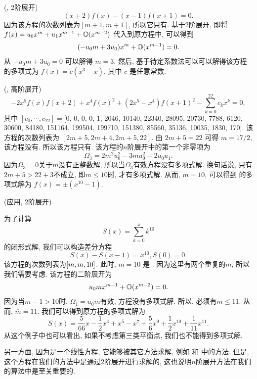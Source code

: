 \begin{example}
(\BPthree{}, 2阶展开)
\begin{equation}
(x+2)f(x)-(x-1)f(x+1)=0. \label{ep3}
\end{equation}
因为该方程的次数列表为$[m+1,m+1]$, 所以它只有\BPthree{}. 基于2阶展开, 即将$f(x)=u_0 x^m + u_1 x^{m-1} + \mathbb O(x^{m-2})$ 代入到原方程中, 可以得到
\begin{equation}
(-u_0 m+3u_0)x^m+\mathbb O(x^{m-1})=0.
\end{equation}
从 $-u_0 m+3u_0=0$ 可以解得 $m=3$. 然后, 基于待定系数法可以可以解得该方程的多项式为 $f(x)=c(x^3-x)$, 其中 $c$ 是任意常数.
\end{example}

\begin{example}
(\BPthree{}, 高阶展开)
\begin{equation}
-2x^5f(x)f(x+2)+x^4f(x)^2+(2x^5-x^4)f(x+1)^2-\sum_{k=0}^{22}{c_k x^k}=0, \label{ep4}
\end{equation}
其中 $[c_0,\cdots,c_{22}]=$[0, 0, 0, 0, 1, 2046, 10140, 22340, 28095, 20730, 7788, 6120, 30600, 84180, 151164, 199504, 199710, 151380, 85560, 35136, 10035, 1830, 170]. 该方程的次数列表为 $[2m+5,2m+4,2m+5,22]$. 由 $2m+5=22$ 可得 $ m=17/2$, 该方程没有\BPone{}. 所以该方程只有\BPthree{}. 该方程的$n$阶展开中的第一个非零项为 
\begin{equation}
\Omega_3 = 2m^2u_0^2-3mu_0^2-2u_0u_1.
\end{equation}
因为$\Omega_3=0$关于$m$没有正整数解, 所以当$\Omega_3$有效方程没有多项式解. 换句话说, 只有$2m+5>22+3$不成立, 即$m\le 10$时, 才有多项式解. 从而, $\overline m =10$, 可以得到 的多项式解为 $f(x)=\pm (x^{10}-1)$.
\end{example}

\begin{example}
(应用, 2阶展开)

为了计算 
\begin{equation}
    S(x)=\sum_{k=0}^x{k^{10}}
\end{equation}
的闭形式解, 我们可以构造差分方程
\begin{equation}
    S(x)-S(x-1)=x^{10}, S(0)=0. \label{seq}
\end{equation}
该方程的次数列表为$\left[m,m,10\right]$. 此时, $m=10$ 是 \BPone{}. 因为这里有两个重复的$m$, 所以我们需要考虑\BPthree{}. 该方程的二阶展开为
\begin{equation}
u_0m x^{m-1}+\mathbb O(x^{m-2})=0.   
\end{equation}
因为当$m-1>10$时, $\Omega_1=u_0m$有效, 方程没有多项式解. 所以, 必须有$m\le 11$. 从而, $\overline m=11$. 我们可以得到原方程的多项式解为
\begin{equation}
S(x)=\frac{5}{66}x-\frac{1}{2}x^3+x^5-x^7+\frac{5}{6}x^9+\frac{1}{2}x^{10}+\frac{1}{11}x^{11}.
\end{equation}
从这个例子中也可以看出, 如果不考虑第三类平衡点, 我们也不能得到多项式解. 

另一方面, 因为是一个线性方程, 它能够被其它方法求解, 例如  和  中的方法. 但是, 这个方程在我们的方法中是通过2阶展开进行求解的, 这也说明$n$阶展开方法在我们的算法中是至关重要的.  
\end{example}

